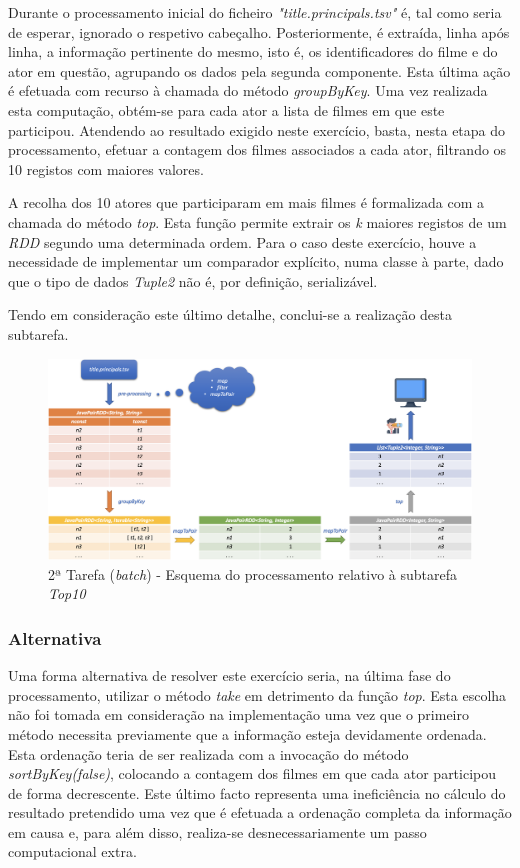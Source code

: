 \documentclass[a4paper]{report}
\begin{document}
{		Durante o processamento inicial do ficheiro \textsl{"title.principals.tsv"} é, tal como seria de esperar, ignorado o respetivo cabeçalho.
		Posteriormente, é extraída, linha após linha, a informação pertinente do mesmo, isto é, os identificadores do filme e do ator em questão, agrupando os dados pela segunda componente. Esta última ação é efetuada com recurso à chamada do método \textit{groupByKey}.
		Uma vez realizada esta computação, obtém-se para cada ator a lista de filmes em que este participou. Atendendo ao resultado exigido neste exercício, basta, nesta etapa do processamento, efetuar a contagem dos filmes associados a cada ator, filtrando os 10 registos com maiores valores.

		A recolha dos 10 atores que participaram em mais filmes é formalizada com a chamada do método \textit{top}. Esta função permite extrair os \textit{k} maiores registos de um \textit{RDD} segundo uma determinada ordem.
		Para o caso deste exercício, houve a necessidade de implementar um comparador explícito, numa classe à parte, dado que o tipo de dados \textit{Tuple2} não é, por definição, serializável.

		Tendo em consideração este último detalhe, conclui-se a realização desta subtarefa.

		\begin{figure}[H]
            \centering
            \includegraphics[width=1.0\textwidth]{Imagens/2ª Tarefa - Top10.png}
            \caption{2ª Tarefa (\textit{batch}) - Esquema do processamento relativo à subtarefa \textit{Top10}}
            \label{fig:1}
        \end{figure}

		\subsubsection{Alternativa} \label{sssec:Task2-Top10-Alternativa}
			Uma forma alternativa de resolver este exercício seria, na última fase do processamento, utilizar o método \textit{take} em detrimento da função \textit{top}.
			Esta escolha não foi tomada em consideração na implementação uma vez que o primeiro método necessita previamente que a informação esteja devidamente ordenada.
			Esta ordenação teria de ser realizada com a invocação do método \textit{sortByKey(false)}, colocando a contagem dos filmes em que cada ator participou de forma decrescente.
			Este último facto representa uma ineficiência no cálculo do resultado pretendido uma vez que é efetuada a ordenação completa da informação em causa e, para além disso, realiza-se desnecessariamente um passo computacional extra.

}
\end{document}
